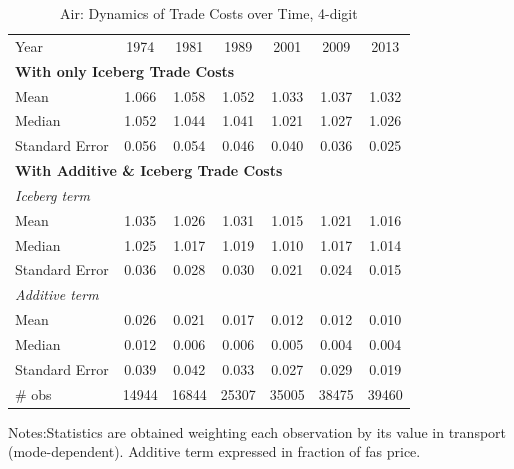 \documentclass[a4paper,11pt]{article}
\begin{document}
\begin{table}[htbp]
  \centering
  \caption{Air: Dynamics of Trade Costs over Time, 4-digit}
\begin{center}
    \begin{tabular}{l|cccccc}
   \hline\hline
Year & 1974  & 1981  & 1989  & 2001  & 2009  & 2013 \\
\multicolumn{7}{l}{\textbf{With only Iceberg Trade Costs} }  \\
Mean  & 1.066 & 1.058 & 1.052 & \multicolumn{1}{c}{1.033} & \multicolumn{1}{c}{1.037} & \multicolumn{1}{c}{1.032} \\
Median & 1.052 & 1.044 & 1.041 & \multicolumn{1}{c}{1.021} & \multicolumn{1}{c}{1.027} & \multicolumn{1}{c}{1.026}  \\
Standard Error & 0.056 & 0.054 & 0.046 & \multicolumn{1}{c}{0.040} & \multicolumn{1}{c}{0.036} & \multicolumn{1}{c}{0.025}  \\
\hline
\multicolumn{7}{l}{\textbf{With Additive \& Iceberg Trade Costs }}  \\ \hline
\textit{Iceberg term} &       &       &       &       &       &     \\
Mean  & 1.035 & 1.026 & 1.031 & \multicolumn{1}{c}{1.015} & \multicolumn{1}{c}{1.021} & \multicolumn{1}{c}{1.016}  \\
Median & 1.025 & 1.017 & 1.019 & \multicolumn{1}{c}{1.010} & \multicolumn{1}{c}{1.017} & \multicolumn{1}{c}{1.014}  \\
Standard Error & 0.036 & 0.028 & 0.030 & \multicolumn{1}{c}{0.021} & \multicolumn{1}{c}{0.024} & \multicolumn{1}{c}{0.015}  \\
\textit{Additive term} &       &       &       &       &       &     \\
Mean  & 0.026 & 0.021 & 0.017 & \multicolumn{1}{c}{0.012} & \multicolumn{1}{c}{0.012} & \multicolumn{1}{c}{0.010} \\
Median & 0.012 & 0.006 & 0.006 & \multicolumn{1}{c}{0.005} & \multicolumn{1}{c}{0.004} & \multicolumn{1}{c}{0.004}  \\
Standard Error & 0.039 & 0.042 & 0.033 & \multicolumn{1}{c}{0.027} & \multicolumn{1}{c}{0.029} & \multicolumn{1}{c}{0.019} \\ \hline
\# obs & 14944 & 16844 & 25307 & \multicolumn{1}{c}{35005} & \multicolumn{1}{c}{38475} & \multicolumn{1}{c}{39460}  \\
\hline\hline
    \end{tabular}%
  \end{center}
  \label{tab:result_air_rob}%
\tiny{Notes:Statistics are obtained weighting each observation by its value in transport (mode-dependent). Additive term expressed in fraction of fas price. }
\end{table}%
\end{document}
